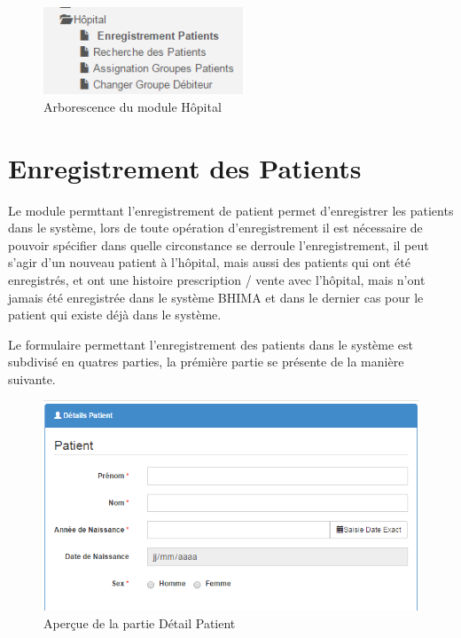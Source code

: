 \documentclass[12pt,a4paper]{report}
\begin{document}
\begin{figure}[h]
\begin{center}
\includegraphics[width=6cm]{pic/HopitalArbo.png}
\end{center}
\caption{Arborescence du module Hôpital}
\label{Arborescence du module Hôpital}
\end{figure}

\section{Enregistrement des Patients}
Le module permttant l'enregistrement de patient permet d'enregistrer les patients dans le système, lors de toute opération d'enregistrement il est nécessaire de pouvoir spécifier dans quelle circonstance se derroule l'enregistrement, il peut s'agir d'un nouveau patient à l'hôpital, mais aussi des patients qui ont été enregistrés, et ont une histoire prescription / vente avec l'hôpital, mais n'ont jamais été enregistrée dans le système BHIMA et dans le dernier cas pour le patient qui existe déjà dans le système. 

Le formulaire permettant l'enregistrement des patients dans le système est subdivisé en quatres parties, la prémière partie se présente de la manière suivante.

\begin{figure}[h]
\begin{center}
\includegraphics[width=12cm]{pic/DetailPatient.png}
\end{center}
\caption{Aperçue de la partie Détail Patient}
\label{Aperçue de la partie Détail Patient}
\end{figure}
\end{document}
